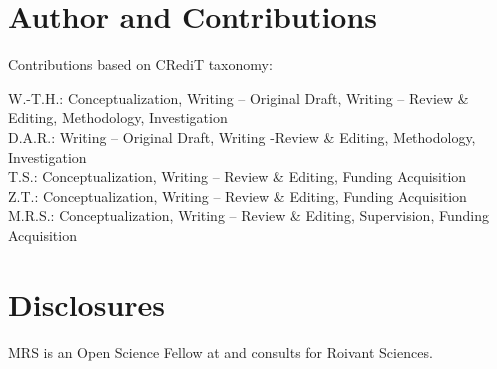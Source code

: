 \documentclass[9pt]{elife}
\begin{document}
\section{Author and Contributions}
Contributions based on CRediT taxonomy:

\noindent W.-T.H.: Conceptualization, Writing – Original Draft, Writing – Review \& Editing, Methodology, Investigation \\
D.A.R.: Writing – Original Draft, Writing -Review \& Editing, Methodology, Investigation  \\
T.S.: Conceptualization, Writing – Review \& Editing, Funding Acquisition \\
Z.T.: Conceptualization, Writing – Review \& Editing, Funding Acquisition \\
M.R.S.: Conceptualization, Writing – Review \& Editing, Supervision, Funding Acquisition \\

\section{Disclosures}
MRS is an Open Science Fellow at and consults for Roivant Sciences.




\clearpage

\clearpage
\end{document}
